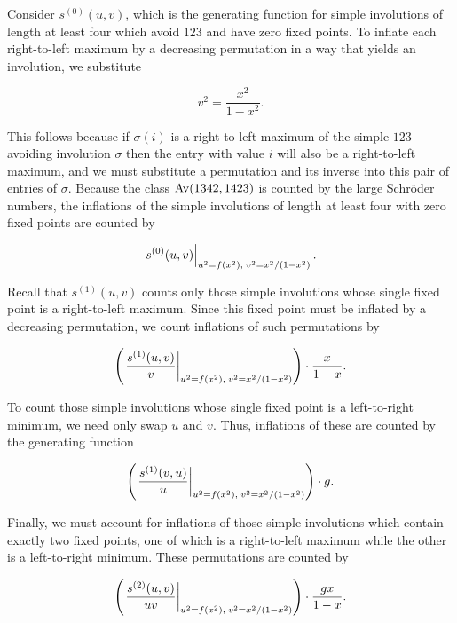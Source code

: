     Consider $s^{(0)}(u,v)$, which is the generating function for
    simple involutions of length at least four which avoid $123$ and have zero
    fixed points. To inflate each right-to-left maximum by a decreasing
    permutation in a way that yields an involution, we substitute 
    
    $$ v^2 = \frac{x^2}{1-x^2} .$$

    This follows because if $\sigma(i)$ is a right-to-left maximum of the simple
    $123$-avoiding involution $\sigma$ then the entry with value $i$ will also be
    a right-to-left maximum, and we must substitute a permutation and its inverse
    into this pair of entries of $\sigma$. Because the class $\operatorname{{Av}}(1342,1423)$ is
    counted by the large Schr\"oder numbers, the inflations of the simple
    involutions of length at least four with zero fixed points are counted by

    \begin{equation}
      \label{involutions:eqn:1342-3}
      \eval{s^{(0)}(u,v)}_{u^2=f(x^2),\;v^2=x^2/(1-x^2)}.
    \end{equation}
      
    Recall that $s^{(1)}(u,v)$ counts only those simple involutions
    whose single fixed point is a right-to-left maximum. Since this fixed point
    must be inflated by a decreasing permutation, we count inflations of such
    permutations by 
    
    \begin{equation}
      \label{involutions:eqn:1342-4}
      \pa{\eval{\frac{s^{(1)}(u,v)}{v}}_{u^2=f(x^2),\;v^2=x^2/(1-x^2)}}
      \cdot\frac{x}{1-x}.
    \end{equation}

    To count those simple involutions whose single fixed point is a left-to-right
    minimum, we need only swap $u$ and $v$. Thus, inflations of these are counted
    by the generating function 

    \begin{equation}
      \label{involutions:eqn:1342-5}
      \pa{\eval{\frac{s^{(1)}(v,u)}{u}}_{u^2=f(x^2),\;v^2=x^2/(1-x^2)}}\cdot g.
      \end{equation}

    Finally, we must account for inflations of those simple involutions which
    contain exactly two fixed points, one of which is a right-to-left maximum
    while the other is a left-to-right minimum. These permutations are counted by

    \begin{equation} \label{involutions:eqn:1342-6}
      \pa{\eval{\frac{s^{(2)}(u,v)}{uv}}_{u^2=f(x^2),\;v^2=x^2/(1-x^2)}}\cdot\frac{gx}{1-x}.
    \end{equation}

